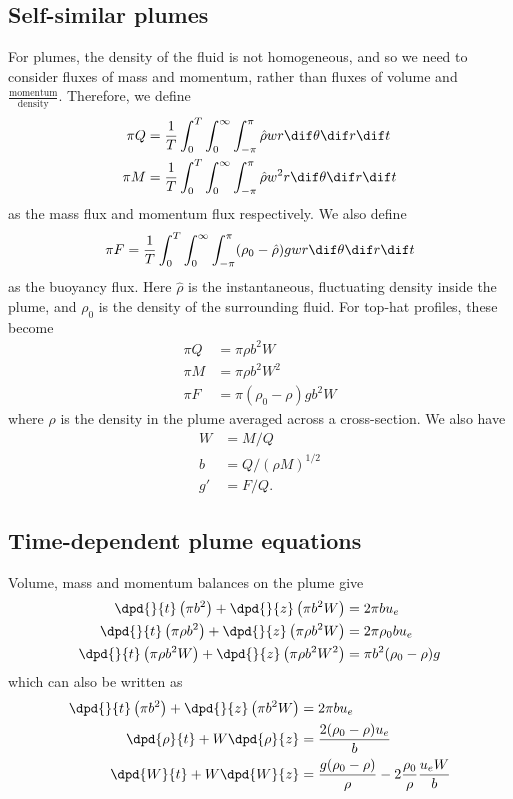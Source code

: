 \subsection{Self-similar plumes}
For plumes, the density of the fluid is not homogeneous, and so we need to consider fluxes of mass and momentum, rather than fluxes of volume and $\displaystyle\frac{\text{momentum}}{\text{density}}$. Therefore, we define
\begin{align}
 \pi Q	&= \frac{1}{T}\int_0^T \int_0^\infty \int_{-\pi}^\pi \hat\rho w r \dif \theta\dif r \dif t \\ 
 \pi M	&= \frac{1}{T}\int_0^T \int_0^\infty \int_{-\pi}^\pi \hat\rho w^2 r \dif \theta\dif r \dif t \\  
\end{align}
as the mass flux and momentum flux respectively. We also define
\begin{equation}
 \pi F		= \frac{1}{T}\int_0^T \int_0^\infty \int_{-\pi}^\pi (\rho_0 - \hat\rho) g w r \dif \theta\dif r \dif t \\ 
\end{equation}
as the buoyancy flux. Here $\hat\rho$ is the instantaneous, fluctuating density inside the plume, and $\rho_0$ is the density of the surrounding fluid. For top-hat profiles, these become
\begin{align}
 \pi Q	&= \pi\rho b^2 W \\
 \pi M	&= \pi\rho b^2 W^2 \\
 \pi F		&= \pi(\rho_0 - \rho) gb^2W
\end{align}
where $\rho$ is the density in the plume averaged across a cross-section. We also have
\begin{align}
 W		&= M/Q \\
 b		&= Q/(\rho M)^{1/2} \\
 g'		&= F/Q.
\end{align}

\subsection{Time-dependent plume equations}

Volume, mass and momentum balances on the plume give
\begin{align}
 \dpd{}{t} \left(\pi b^2\right) + \dpd{}{z} \left(\pi b^2 W\right) &= 2\pi b u_e \\
 \dpd{}{t} \left(\pi \rho b^2\right) + \dpd{}{z} \left(\pi \rho b^2 W\right) &= 2\pi \rho_0 b u_e \\
 \dpd{}{t} \left(\pi \rho b^2 W\right) + \dpd{}{z} \left(\pi \rho b^2 W^2\right) &= \pi b^2 (\rho_0 - \rho) g \\
\end{align}
which can also be written as 
\begin{align}
 \dpd{}{t} \left(\pi b^2\right) + \dpd{}{z} \left(\pi b^2 W\right) &= 2\pi b u_e \\
 \dpd{\rho}{t} + W\dpd{\rho}{z} &= \frac{2(\rho_0 - \rho) u_e}{b} \\
 \dpd{W}{t} + W\dpd{W}{z} &= \frac{g (\rho_0 - \rho)}{\rho} - 2\frac{\rho_0}{\rho} \frac{u_e W}{b}
\end{align}

